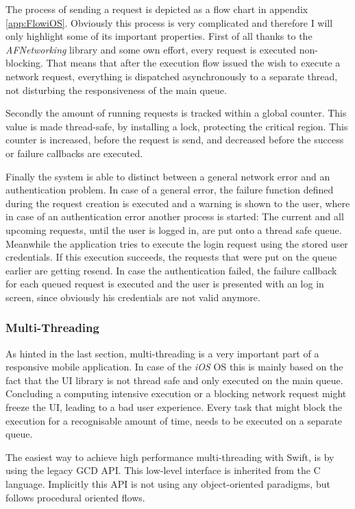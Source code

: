 The process of sending a request is depicted as a flow chart in appendix \vref{app:FlowiOS}. Obviously this process is very complicated and therefore I will only highlight some of its important properties. First of all thanks to the \emph{AFNetworking} library and some own effort, every request is executed non-blocking. That means that after the execution flow issued the wish to execute a network request, everything is dispatched asynchronously to a  separate thread, not disturbing the responsiveness of the main queue.

Secondly the amount of running requests is tracked within a global counter. This value is made thread-safe, by installing a lock, protecting the critical region. This counter is increased, before the request is send, and decreased before the success or failure callbacks are executed.

Finally the system is able to distinct between a general network error and an authentication problem. In case of a general error, the failure function defined during the request creation is executed and a warning is shown to the user, where in case of an authentication error another process is started: The current and all upcoming requests, until the user is logged in, are put onto a thread safe queue. Meanwhile the application tries to execute the login request using the stored user credentials. If this execution succeeds, the requests that were put on the queue earlier are getting resend. In case the authentication failed, the failure callback for each queued request is executed and the user is presented with an log in screen, since obviously his credentials are not valid anymore. 

\subsubsection{Multi-Threading}

As hinted in the last section, multi-threading is a very important part of a responsive mobile application. In case of the \emph{iOS} \acrlong{OS} this is mainly based on the fact that the \gls{UI} library is not thread safe and only executed on the main queue. Concluding a computing intensive execution or a blocking network request might freeze the \gls{UI}, leading to a bad user experience. Every task that might block the execution for a recognisable amount of time, needs to be executed on a separate queue.

The easiest way to achieve high performance multi-threading with \gls{Swift}, is by using the legacy \gls{GCD} \gls{API}. This low-level interface is inherited from the C language. Implicitly this \gls{API} is not using any object-oriented paradigms, but follows procedural oriented flows. 

